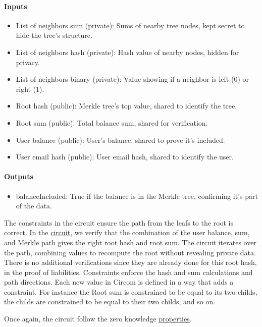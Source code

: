 \paragraph{Inputs}
\begin{itemize}
   \item List of neighbors sum (private): Sums of nearby tree nodes, kept secret to hide the tree's structure.
   \item List of neighbors hash (private): Hash value of nearby nodes, hidden for privacy.
   \item List of neighbors binary (private): Value showing if a neighbor is left (0) or right (1).
   \item Root hash (public): Merkle tree's top value, shared to identify the tree.
   \item Root sum (public): Total balance sum, shared for verification.
   \item User balance (public): User's balance, shared to prove it's included.
   \item User email hash (public): User email hash, shared to identify the user.
   \end{itemize}

\paragraph{Outputs}
\begin{itemize}
   \item balanceIncluded: True if the balance is in the Merkle tree, confirming it's part of the data.
   \end{itemize}


The constraints in the circuit ensure the path from the leafs to the root is correct. 
In the \hyperref[subsec:pic]{circuit}, we verify that the combination of the user balance, sum, and Merkle path gives the right root hash and root sum. 
The circuit iterates over the path, combining values to recompute the root without revealing private data. 
There is no additional verifications since they are already done for this root hash, in the proof of liabilities. 
Constraints enforce the hash and sum calculations and path directions. 
Each new value in Circom is defined in a way that adds a constraint. For instance the Root sum is constrained to be equal to its two childs, the childs are constrained to be equal to their two childs, and so on.

Once again, the circuit follow the zero knowledge \hyperref[subsec:zkp]{properties}. 


